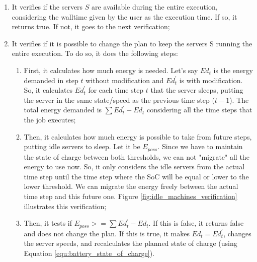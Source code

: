\begin{enumerate}
    \item It verifies if the servers $S$ are available during the entire execution, considering the walltime given by the user as the execution time. If so, it returns true. If not, it goes to the next verification;
    \item It verifies if it is possible to change the plan to keep the servers S running the entire execution. To do so, it does the following steps:
    \begin{enumerate}
        \item First, it calculates how much energy is needed. Let's say $Ed_t$ is the energy demanded in step $t$ without modification and $Ed_t^{'}$ is with modification. So, it calculates $Ed_t^{'}$ for each time step $t$ that the server sleeps, putting the server in the same state/speed as the previous time step ($t-1$). The total energy demanded is $\sum Ed_t^{'} - Ed_t$ considering all the time steps that the job executes;
        \item Then, it calculates how much energy is possible to take from future steps, putting idle servers to sleep. Let it be $E_{poss}$. Since we have to maintain the state of charge between both thresholds, we can not "migrate" all the energy to use now. So, it only considers the idle servers from the actual time step until the time step where the SoC will be equal or lower to the lower threshold. We can migrate the energy freely between the actual time step and this future one. Figure \ref{fig:idle_machines_verification} illustrates this verification;
        \item Then, it tests if $E_{poss} >= \sum Ed_t^{'} - Ed_t$. If this is false, it returns false and does not change the plan. If this is true, it makes $Ed_t = Ed_t^{'}$, changes the server speeds, and recalculates the planned state of charge (using Equation \ref{equ:battery_state_of_charge}).
    \end{enumerate}
\end{enumerate}

